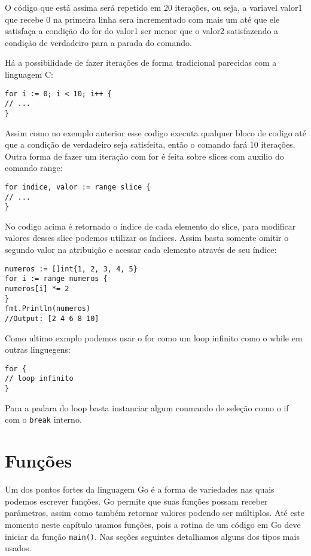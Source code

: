\documentclass{SBCbookchapter}
\begin{document}
O código que está assima será repetido em 20 iterações, ou seja, a variavel valor1 que recebe 0 na primeira linha sera incrementado com mais um até que ele satisfaça a condição do for do valor1 ser menor que o valor2 satisfazendo a condição de verdadeiro para a parada do comando.

Há a possibilidade de fazer iterações de forma tradicional parecidas com a linguagem C: 

\begin{lstlisting}
for i := 0; i < 10; i++ {
// ...
}
\end{lstlisting}

Assim como no exemplo anterior esse codigo executa qualquer bloco de codigo até que a condição de verdadeiro seja satisfeita, então o comando fará 10 iterações. Outra forma de fazer um iteração com for é feita sobre slices com auxilio do comando range:

\begin{lstlisting}
for indice, valor := range slice {
// ...
}
\end{lstlisting}

No codigo acima é retornado o índice de cada elemento do slice, para modificar valores desses slice podemos utilizar os índices. Assim basta somente omitir o segundo valor na atribuição e acessar cada elemento
através de seu índice: 


\begin{lstlisting}
numeros := []int{1, 2, 3, 4, 5}
for i := range numeros {
numeros[i] *= 2
}
fmt.Println(numeros)
//Output: [2 4 6 8 10]
\end{lstlisting}

Como ultimo exmplo podemos usar o for como um loop infinito como o while em outras linguegens:
\begin{lstlisting}
for {
// loop infinito
}
\end{lstlisting}
Para a padara do loop basta instanciar algum conmando de seleção como o if com o \texttt{break} interno.

\section{Funções}

Um dos pontos fortes da linguagem Go é a forma de variedades nas quais podemos escrever funções. Go permite que suas funções possam receber parâmetros, assim como também retornar valores podendo ser múltiplos. Até este momento neste capítulo usamos funções, pois a rotina de um código em Go deve iniciar da função \texttt{main()}. Nas seções seguintes detalhamos alguns dos tipos mais usados.
\end{document}
